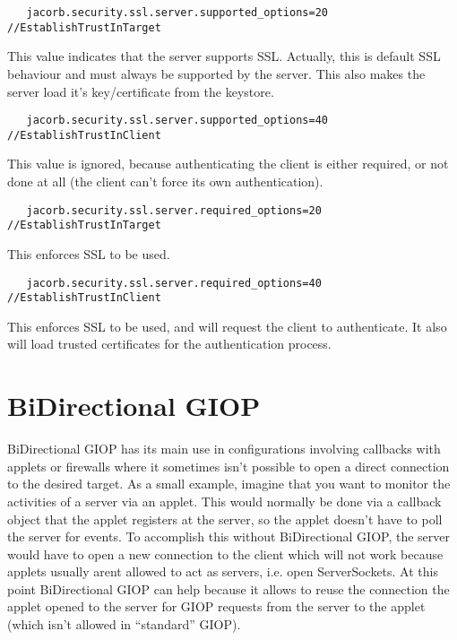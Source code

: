 \documentclass[12pt]{scrbook}
\begin{document}
\begin{verbatim}
   jacorb.security.ssl.server.supported_options=20 //EstablishTrustInTarget
\end{verbatim}
This value indicates that the server supports SSL. Actually, this is default
SSL behaviour and must always be supported by the server. This also makes the
server load it's key/certificate from the keystore.

\begin{verbatim}
   jacorb.security.ssl.server.supported_options=40 //EstablishTrustInClient
\end{verbatim}
This value is ignored, because authenticating the client is either
required, or not done at all (the client can't force its own
authentication).

\begin{verbatim}
   jacorb.security.ssl.server.required_options=20 //EstablishTrustInTarget
\end{verbatim}
This enforces SSL to be used.

\begin{verbatim}
   jacorb.security.ssl.server.required_options=40 //EstablishTrustInClient
\end{verbatim}
This enforces SSL to be used, and will request the client to authenticate. It
also will load trusted certificates for the authentication process.


\chapter{BiDirectional GIOP}

BiDirectional GIOP has its main use in configurations involving callbacks with
applets or firewalls where it sometimes isn't possible to open a direct
connection to the desired target. As a small example, imagine that you want to
monitor the activities of a server via an applet. This would normally be done
via a callback object that the applet registers at the server, so the applet
doesn't have to poll the server for events. To accomplish this without
BiDirectional GIOP, the server would have to open a new connection to the
client which will not work because applets usually arent allowed to act as
servers, i.e. open ServerSockets. At this point BiDirectional GIOP can help
because it allows to reuse the connection the applet opened to the server for
GIOP requests from the server to the applet (which isn't allowed in
``standard'' GIOP).
\end{document}
